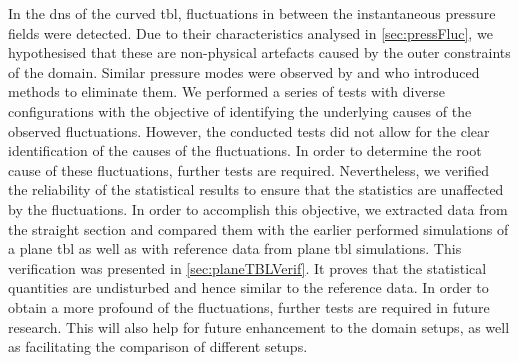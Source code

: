 In the \acrshort{dns} of the curved \acrshort{tbl},  fluctuations in between the instantaneous pressure fields were detected.
Due to their characteristics analysed in \autoref{sec:pressFluc}, we hypothesised  that these are non-physical artefacts caused by the outer  constraints of the domain.
Similar pressure modes were observed by \citet{maday_spectral_1989} and \citet{sabbah_filtering_2001} who introduced methods to eliminate them.
We performed  a series of tests with diverse configurations with the objective of identifying the underlying causes of the observed fluctuations.
However, the conducted tests did not allow for the clear identification of  the causes of the fluctuations.
In order to determine the root cause of these fluctuations, further tests are required.
Nevertheless, we verified the reliability of the statistical results to ensure that the statistics are unaffected by the fluctuations.
In order to accomplish this objective,   we extracted data from the straight section and compared them with the earlier performed simulations of a plane \acrshort{tbl} as well as with reference data from plane \acrshort{tbl} simulations.
This verification was presented in \autoref{sec:planeTBLVerif}. It proves  that the statistical quantities are undisturbed and hence similar to the reference data.
In order to obtain a  more profound  of the fluctuations, further tests are required in future research.
This will also help for future enhancement to  the domain setups, as well as facilitating the comparison of different setups.

